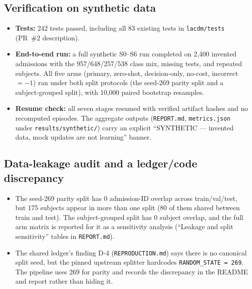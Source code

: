 \documentclass[11pt,letterpaper]{article}
\begin{document}
\subsection{Verification on synthetic data}
\begin{itemize}
  \item \textbf{Tests:} 242 tests passed, including all 83 existing tests in \texttt{lacdm/tests} (PR~\#2 description).
  \item \textbf{End-to-end run:} a full synthetic S0--S6 run completed on 2,400 invented admissions with the 957/648/257/538 class mix, missing tests, and repeated subjects. All five arms (primary, zero-shot, decision-only, no-cost, incorrect~$=-1$) ran under both split protocols (the seed-269 parity split and a subject-grouped split), with 10,000 paired bootstrap resamples.
  \item \textbf{Resume check:} all seven stages resumed with verified artifact hashes and no recomputed episodes. The aggregate outputs (\texttt{REPORT.md}, \texttt{metrics.json} under \texttt{results/synthetic/}) carry an explicit ``SYNTHETIC --- invented data, mock updates are not learning'' banner.
\end{itemize}

\subsection{Data-leakage audit and a ledger/code discrepancy}
\begin{itemize}
  \item The seed-269 parity split has 0 admission-ID overlap across train/val/test, but 175 subjects appear in more than one split (80 of them shared between train and test). The subject-grouped split has 0 subject overlap, and the full arm matrix is reported for it as a sensitivity analysis (``Leakage and split sensitivity'' tables in \texttt{REPORT.md}).
  \item The shared ledger's finding D-4 (\texttt{REPRODUCTION.md}) says there is no canonical split seed, but the pinned upstream splitter hardcodes \texttt{RANDOM\_STATE = 269}. The pipeline uses 269 for parity and records the discrepancy in the README and report rather than hiding it.
\end{itemize}
\end{document}
